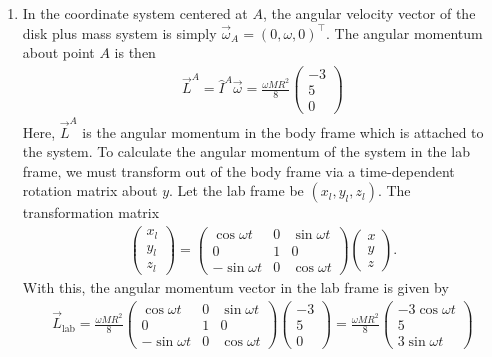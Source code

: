 \documentclass{article}
\theoremstyle{definition}
\newcommand{\f}[2]{\frac{#1}{#2}}
\begin{document}
\begin{enumerate}[label=(\alph*)]
	
	\item In the coordinate system centered at $A$, the angular velocity vector of the disk plus mass system is simply $\vec{\omega}_A = (0,\omega,0)^\top$. The angular momentum about point $A$ is then 
	\begin{align*}
	\vec{L}^A = \hat I^A \vec{\omega}= \f{\omega MR^2}{8}\begin{pmatrix}
	-3 \\ 5 \\ 0
	\end{pmatrix}
	\end{align*}
	Here, $\vec{L}^A$ is the angular momentum in the body frame which is attached to the system. To calculate the angular momentum of the system in the lab frame, we must transform out of the body frame via a time-dependent rotation matrix about $y$. Let the lab frame be $(x_l, y_l, z_l)$. The transformation matrix 
	\begin{align*}
	\begin{pmatrix}
	x_l \\ y_l \\ z_l 
	\end{pmatrix}
	= 
	\begin{pmatrix}
	\cos\omega t & 0 & \sin\omega t \\
	0&1&0 \\
	-\sin\omega t& 0 & \cos\omega t
	\end{pmatrix}
	\begin{pmatrix}
	x\\y\\z
	\end{pmatrix}.
	\end{align*}
	With this, the angular momentum vector in the lab frame is given by 
	\begin{align*}
	\vec{L}_\text{lab} = 
	\f{\omega MR^2}{8}\begin{pmatrix}
	\cos\omega t & 0 & \sin\omega t \\
	0&1&0 \\
	-\sin\omega t& 0 & \cos\omega t
	\end{pmatrix} 
	\begin{pmatrix}
	-3 \\ 5 \\ 0
	\end{pmatrix} = \boxed{\f{\omega MR^2}{8}
	\begin{pmatrix}
	-3\cos\omega t \\
	5 \\ 
	3\sin\omega t
	\end{pmatrix}}
	\end{align*}
	

\end{enumerate}
\end{document}
